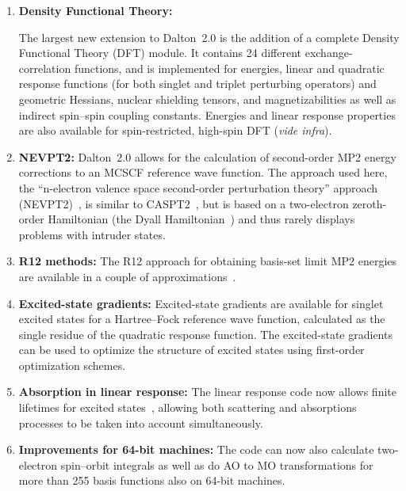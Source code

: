 \begin{enumerate}
\item{\bf Density Functional Theory:}

The largest new extension to Dalton~2.0 is the addition of a complete
Density Functional Theory (DFT) module. It contains 24 different
exchange-correlation  functions,
 and is implemented for energies,
linear and quadratic response functions (for both singlet and triplet
perturbing operators) and geometric Hessians, nuclear shielding
tensors, and magnetizabilities as well as indirect spin--spin coupling
constants. Energies and linear response properties are also available
for spin-restricted, high-spin DFT ({\em vide infra\/}).


\item{\bf NEVPT2:} Dalton~2.0 allows for the calculation of
  second-order MP2 energy corrections to an MCSCF reference wave
  function. The approach used here, the ``n-electron valence space
  second-order perturbation theory'' approach (NEVPT2)~\cite{carcsetljpmjcp114,carcjpmcpl350,carcjpmjcp117}, is similar to
  CASPT2~\cite{kapamborjcp96}, but is based on a two-electron zeroth-order
  Hamiltonian (the Dyall Hamiltonian~\cite{kgdjcp102}) and thus rarely displays
  problems with intruder states.

\item{\bf R12 methods:} The R12 approach for obtaining basis-set limit
MP2 energies are available in a couple of  approximations~\cite{wkccmsjcp116,ccmswkthcpc149}.

\item{\bf Excited-state gradients:} Excited-state gradients are
  available for singlet excited states for a Hartree--Fock reference
  wave function, calculated as the single residue of the quadratic
  response function. The excited-state gradients can be used to
  optimize the structure of excited states using first-order
  optimization schemes.

\item{\bf Absorption in linear response:} The linear response code now
  allows finite lifetimes for excited states~\cite{pndmbhjajjojcp115}, allowing both scattering
  and absorptions processes to be taken into account simultaneously.

\item{\bf Improvements for 64-bit machines:} The code can now also
  calculate two-electron spin--orbit integrals as well as do AO to MO
  transformations for more than 255 basis functions also on 64-bit
  machines.


\end{enumerate}
